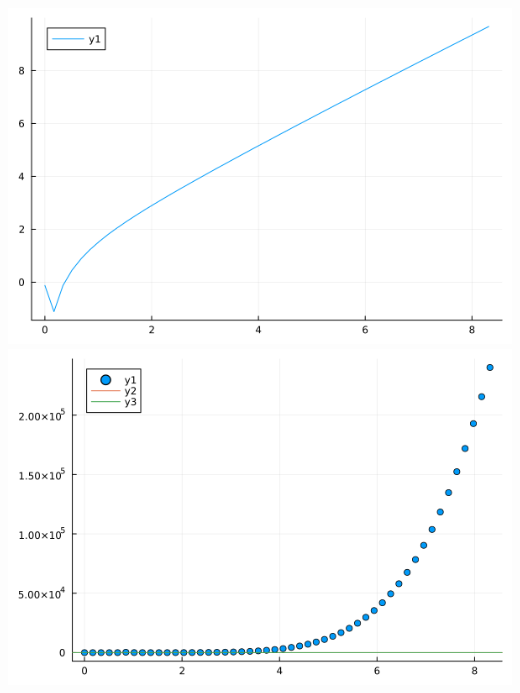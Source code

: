 \documentclass{article}
\begin{document}
\includegraphics[scale = 0.5]{consumptionc.png}\\
\includegraphics[scale = 0.5]{residc.png}\\
\end{document}
